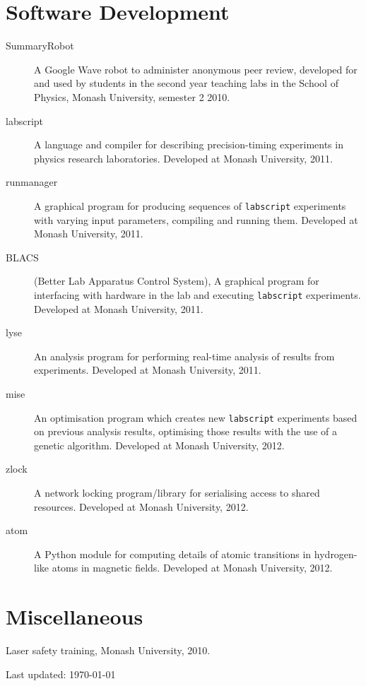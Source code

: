\documentclass[10pt,letterpaper]{article}
\renewenvironment{itemize}{
  \begin{list}{}{
    \setlength{\leftmargin}{1.5em}
    \setlength{\itemsep}{0.25em}
    \setlength{\parskip}{0pt}
    \setlength{\parsep}{0.25em}
  }
}{
  \end{list}
}
\begin{document}
\section*{Software Development}
\begin{description}
\item[SummaryRobot] A Google Wave robot to administer anonymous peer review, developed for and used by students in the second year teaching labs in the School of Physics, Monash University, semester 2 2010.

\item[labscript] A language and compiler for describing precision-timing experiments in physics research laboratories. Developed at Monash University, 2011.

\item[runmanager] A graphical program for producing sequences of \texttt{labscript} experiments with varying input parameters, compiling and running them. Developed at Monash University, 2011.

\item[BLACS] (Better Lab Apparatus Control System), A graphical program for interfacing with hardware in the lab and executing \texttt{labscript} experiments. Developed at Monash University, 2011.

\item[lyse] An analysis program for performing real-time analysis of results from experiments.  Developed at Monash University, 2011.

\item[mise] An optimisation program which creates new \texttt{labscript} experiments based on previous analysis results, optimising those results with the use of a genetic algorithm.  Developed at Monash University, 2012.

\item[zlock] A network locking program/library for serialising access to shared resources. Developed at Monash University, 2012.

\item[atom] A Python module for computing details of atomic transitions in hydrogen-like atoms in magnetic fields. Developed at Monash University, 2012.
\end{description}

\section*{Miscellaneous}

\begin{itemize}
\item Laser safety training, Monash University, 2010.
\end{itemize}

\medskip

\begin{center}
  \begin{small}
    Last updated: \today
  \end{small}
\end{center}
\end{document}

